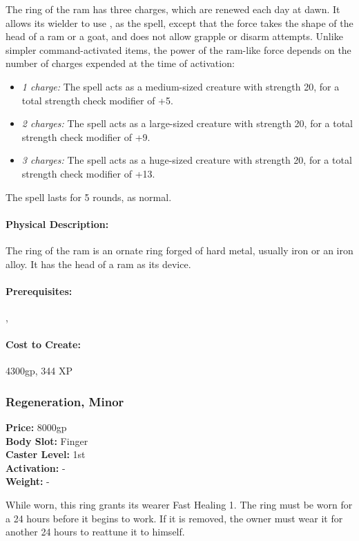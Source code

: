 The ring of the ram has three charges, which are renewed each day at dawn. It allows its wielder to use , as the spell, except that the force takes the shape of the head of a ram or a goat, and does not allow grapple or disarm attempts. Unlike simpler command-activated items, the power of the ram-like force depends on the number of charges expended at the time of activation:
\begin{itemize}
\item \emph{1 charge:} The spell acts as a medium-sized creature with strength 20, for a total strength check modifier of +5.
\item \emph{2 charges:} The spell acts as a large-sized creature with strength 20, for a total strength check modifier of +9.
\item \emph{3 charges:} The spell acts as a huge-sized creature with strength 20, for a total strength check modifier of +13.
\end{itemize}
The spell lasts for 5 rounds, as normal.

\paragraph{Physical Description:} The ring of the ram is an ornate ring forged of hard metal, usually iron or an iron alloy. It has the head of a ram as its device.

\paragraph{Prerequisites:} , 

\paragraph{Cost to Create:} 4300gp, 344 XP
\subsubsection{Regeneration, Minor}
\label{Item:RegenerationMinor}
   \textbf{Price:} 8000gp
\\ \textbf{Body Slot:} Finger
\\ \textbf{Caster Level:} 1st
\\ \textbf{Activation:} -
\\ \textbf{Weight:} -

While worn, this ring grants its wearer Fast Healing 1.
The ring must be worn for a 24 hours before it begins to work. If it is removed, the owner must wear it for another 24 hours to reattune it to himself.

